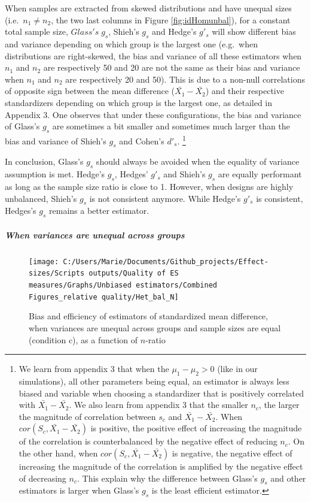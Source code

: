 \documentclass[
  man,floatsintext]{apa6}
\begin{document}
When samples are extracted from skewed distributions and have unequal sizes (i.e.~\(n_1 \neq n_2\), the two last columns in Figure \ref{fig:idHomunbal}), for a constant total sample size, \(Glass's \; g_s\), Shieh's \(g_s\) and Hedge's \(g'_s\) will show different bias and variance depending on which group is the largest one (e.g.~when distributions are right-skewed, the bias and variance of all these estimators when \(n_1\) and \(n_2\) are respectively 50 and 20 are not the same as their bias and variance when \(n_1\) and \(n_2\) are respectively 20 and 50). This is due to a non-null correlations of opposite sign between the mean difference (\(\bar{X_1}-\bar{X_2}\)) and their respective standardizers depending on which group is the largest one, as detailed in Appendix 3. One observes that under these configurations, the bias and variance of Glass's \(g_s\) are sometimes a bit smaller and sometimes much larger than the bias and variance of Shieh's \(g_s\) and Cohen's \(d'_s\). \footnote{We learn from appendix 3 that when the $\mu_1-\mu_2 >0$ (like in our simulations), all other parameters being equal, an estimator is always less biased and variable when choosing a standardizer that is positively correlated with $\bar{X_1}-\bar{X_2}$. We also learn from appendix 3 that the smaller $n_c$, the larger the magnitude of correlation between $s_c$ and $\bar{X_1}-\bar{X_2}$. When $cor(S_c,\bar{X_1}-\bar{X_2})$ is positive, the positive effect of increasing the magnitude of the correlation is counterbalanced by the negative effect of reducing $n_c$. On the other hand, when $cor(S_c,\bar{X_1}-\bar{X_2})$ is negative, the negative effect of increasing the magnitude of the correlation is amplified by the negative effect of decreasing $n_c$. This explain why the difference between Glass's $g_s$ and other estimators is larger when Glass's $g_s$ is the least efficient estimator.}

In conclusion, Glass's \(g_s\) should always be avoided when the equality of variance assumption is met. Hedge's \(g_s\), Hedges' \(g'_s\) and Shieh's \(g_s\) are equally performant as long as the sample size ratio is close to 1. However, when designs are highly unbalanced, Shieh's \(g_s\) is not consistent anymore. While Hedge's \(g'_s\) is consistent, Hedges's \(g_s\) remains a better estimator.

\hypertarget{when-variances-are-unequal-across-groups}{%
\subparagraph{When variances are unequal across groups}\label{when-variances-are-unequal-across-groups}}

\begin{figure}

{\centering \texttt{[image: C:/Users/Marie/Documents/Github\_projects/Effect-sizes/Scripts outputs/Quality of ES measures/Graphs/Unbiased estimators/Combined Figures\_relative quality/Het\_bal\_N]} 

}

\caption{Bias and efficiency of estimators of standardized mean difference, when variances are unequal across groups and sample sizes are equal (condition c), as a function of $n$-ratio}\label{fig:idHetbal1}
\end{figure}
\end{document}
